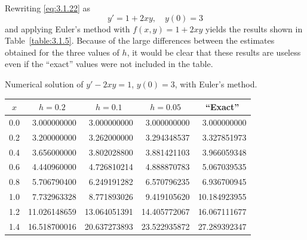 \begin{examplesolution}
 Rewriting \eqref{eq:3.1.22} as
\begin{equation}
  \label{eq:3.1.24}y'=1+2xy,\quad y(0)=3
\end{equation}
and applying Euler's method with $f(x,y)=1+2xy$ yields the results shown in Table~\ref{table:3.1.5}.
Because of the large differences between the estimates obtained for the three values of $h$, it
would be clear that these results are useless even if the ``exact'' values were not included in the
table.

\begin{newtable}
  \label{table:3.1.5} Numerical solution of $y'-2xy=1$, $y(0)=3$, with Euler's method.
  \begin{center}
    \begin{tabular}{|c|r|r|r|r|}
      \hline
      \multicolumn{1}{|c|}{$x$} & \multicolumn{1}{|c|}{$h=0.2$} & \multicolumn{1}{|c|}{$h=0.1$} & \multicolumn{1}{|c|}{$h=0.05$} & \multicolumn{1}{|c|}{``Exact''} \\
      \hline
      0.0                       & 3.000000000                   & 3.000000000                   & 3.000000000                    & 3.000000000                     \\
      0.2                       & 3.200000000                   & 3.262000000                   & 3.294348537                    & 3.327851973                     \\
      0.4                       & 3.656000000                   & 3.802028800                   & 3.881421103                    & 3.966059348                     \\
      0.6                       & 4.440960000                   & 4.726810214                   & 4.888870783                    & 5.067039535                     \\
      0.8                       & 5.706790400                   & 6.249191282                   & 6.570796235                    & 6.936700945                     \\
      1.0                       & 7.732963328                   & 8.771893026                   & 9.419105620                    & 10.184923955                    \\
      1.2                       & 11.026148659                  & 13.064051391                  & 14.405772067                   & 16.067111677                    \\
      1.4                       & 16.518700016                  & 20.637273893                  & 23.522935872                   & 27.289392347                    \\

\end{tabular}
\end{center}
\end{newtable}
\end{examplesolution}
